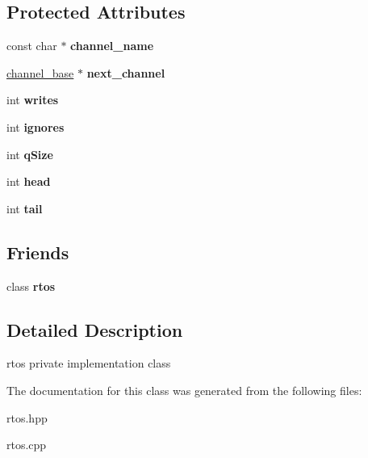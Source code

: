 \subsection*{Protected Attributes}
\begin{DoxyCompactItemize}
\item 
const char $\ast$ {\bfseries channel\+\_\+name}\hypertarget{classrtos_1_1channel__base_a3bf6e1331394d5ab745a3a7ed379350c}{}\label{classrtos_1_1channel__base_a3bf6e1331394d5ab745a3a7ed379350c}

\item 
\hyperlink{classrtos_1_1channel__base}{channel\+\_\+base} $\ast$ {\bfseries next\+\_\+channel}\hypertarget{classrtos_1_1channel__base_a5fa1e6fec7ef127baa8d5e4582c96eb6}{}\label{classrtos_1_1channel__base_a5fa1e6fec7ef127baa8d5e4582c96eb6}

\item 
int {\bfseries writes}\hypertarget{classrtos_1_1channel__base_acf4e395fcddb620239e68aacc53711d7}{}\label{classrtos_1_1channel__base_acf4e395fcddb620239e68aacc53711d7}

\item 
int {\bfseries ignores}\hypertarget{classrtos_1_1channel__base_a0dd92b2936e1e9b33990a59705e8b24f}{}\label{classrtos_1_1channel__base_a0dd92b2936e1e9b33990a59705e8b24f}

\item 
int {\bfseries q\+Size}\hypertarget{classrtos_1_1channel__base_ac7974548c1d1d39b09604640810d22cd}{}\label{classrtos_1_1channel__base_ac7974548c1d1d39b09604640810d22cd}

\item 
int {\bfseries head}\hypertarget{classrtos_1_1channel__base_a9a1e9fd7c97df262cdce5c2fc084148d}{}\label{classrtos_1_1channel__base_a9a1e9fd7c97df262cdce5c2fc084148d}

\item 
int {\bfseries tail}\hypertarget{classrtos_1_1channel__base_a220c246220377d32026f5d26c352b3dd}{}\label{classrtos_1_1channel__base_a220c246220377d32026f5d26c352b3dd}

\end{DoxyCompactItemize}
\subsection*{Friends}
\begin{DoxyCompactItemize}
\item 
class {\bfseries rtos}\hypertarget{classrtos_1_1channel__base_a2a7bcfc34141352757ad672e3ecd099f}{}\label{classrtos_1_1channel__base_a2a7bcfc34141352757ad672e3ecd099f}

\end{DoxyCompactItemize}


\subsection{Detailed Description}
rtos private implementation class 

The documentation for this class was generated from the following files\+:\begin{DoxyCompactItemize}
\item 
rtos.\+hpp\item 
rtos.\+cpp\end{DoxyCompactItemize}
